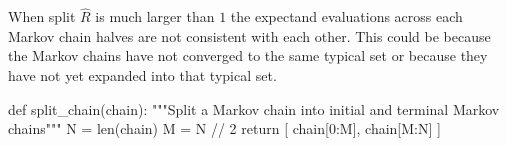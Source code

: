\documentclass[
  letterpaper,
  DIV=11,
  numbers=noendperiod]{scrartcl}
\newenvironment{Shaded}{\begin{snugshade}}{\end{snugshade}}
\newcommand{\BuiltInTok}[1]{\textcolor[rgb]{0.00,0.23,0.31}{#1}}
\newcommand{\CommentTok}[1]{\textcolor[rgb]{0.37,0.37,0.37}{#1}}
\newcommand{\ControlFlowTok}[1]{\textcolor[rgb]{0.00,0.23,0.31}{#1}}
\newcommand{\DecValTok}[1]{\textcolor[rgb]{0.68,0.00,0.00}{#1}}
\newcommand{\KeywordTok}[1]{\textcolor[rgb]{0.00,0.23,0.31}{#1}}
\newcommand{\NormalTok}[1]{\textcolor[rgb]{0.00,0.23,0.31}{#1}}
\newcommand{\OperatorTok}[1]{\textcolor[rgb]{0.37,0.37,0.37}{#1}}
\begin{document}
When split \(\hat{R}\) is much larger than \(1\) the expectand
evaluations across each Markov chain halves are not consistent with each
other. This could be because the Markov chains have not converged to the
same typical set or because they have not yet expanded into that typical
set.

\begin{Shaded}
\begin{Highlighting}[]
\KeywordTok{def}\NormalTok{ split\_chain(chain):}
  \CommentTok{"""Split a Markov chain into initial and terminal Markov chains"""}
\NormalTok{  N }\OperatorTok{=} \BuiltInTok{len}\NormalTok{(chain)}
\NormalTok{  M }\OperatorTok{=}\NormalTok{ N }\OperatorTok{//} \DecValTok{2}
  \ControlFlowTok{return}\NormalTok{ [ chain[}\DecValTok{0}\NormalTok{:M], chain[M:N] ]}
\end{Highlighting}
\end{Shaded}
\end{document}
